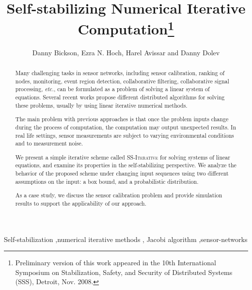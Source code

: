 \documentclass[preprint,12pt]{elsarticle}
\newcommand{\syncAlg}{\textsc{SS-Iterative}\xspace}
\begin{document}
\begin{frontmatter}






\title{Self-stabilizing Numerical Iterative Computation\footnote{Preliminary version of this work appeared
in the 10th International Symposium on Stabilization, Safety, and Security of Distributed Systems (SSS), Detroit, Nov. 2008.}}




\author{Danny Bickson, Ezra N. Hoch, Harel Avissar and Danny Dolev}



\address[IBM]{
IBM Haifa Research Lab\\
Mount Carmel\\Haifa 31905, Israel\\
Email: \{dannybi\}@il.ibm.com\\
}
\address[HUJI]{School of Computer Science and Engineering\\
The Hebrew University of Jerusalem\\
Jerusalem 91904, Israel\\
Email: \{hoch,harela01,dolev\}@cs.huji.ac.il\\
}






\begin{abstract}
Many challenging tasks in sensor networks, including sensor
calibration, ranking of nodes, monitoring, event region detection,
collaborative filtering, collaborative signal processing, {\em etc.}, can
be formulated as a problem of solving a linear system of
equations. Several recent works propose different distributed
algorithms for solving these problems, usually by using linear iterative numerical
methods.

The main problem with previous approaches is that once the problem inputs
change during the process of computation, the computation may output unexpected results.
In real life settings, sensor measurements are subject to
varying environmental conditions and to measurement noise.

We present a simple iterative scheme called \syncAlg for solving
systems of linear equations, and examine its properties in the self-stabilizing
perspective. We analyze the behavior of the proposed scheme under changing input sequences using two different assumptions on the input: a box bound, and a probabilistic distribution.


As a case study, we discuss the sensor calibration problem and
provide simulation results to support the applicability of our
approach.
\end{abstract}

\begin{keyword}
Self-stabilization \sep numerical iterative methods \sep
Jacobi algorithm \sep sensor-networks






\end{keyword}

\end{frontmatter}
\end{document}
